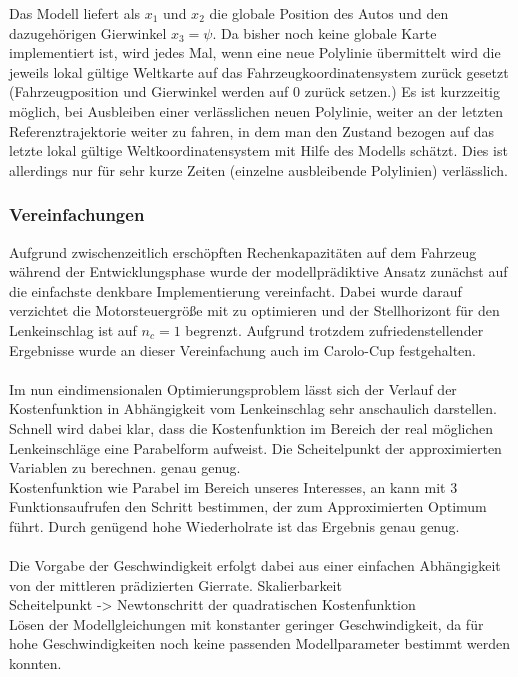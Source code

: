 Das Modell liefert als $x_1$ und $x_2$ die globale Position des Autos und den dazugehörigen Gierwinkel $x_3=\psi$. Da bisher noch keine globale Karte implementiert ist, wird jedes Mal, wenn eine neue Polylinie übermittelt wird die jeweils lokal gültige Weltkarte auf das Fahrzeugkoordinatensystem zurück gesetzt (Fahrzeugposition und Gierwinkel werden auf 0 zurück setzen.) Es ist kurzzeitig möglich, bei Ausbleiben einer verlässlichen neuen Polylinie, weiter an der letzten Referenztrajektorie weiter zu fahren, in dem man den Zustand bezogen auf das letzte lokal gültige Weltkoordinatensystem mit Hilfe des Modells schätzt. Dies ist allerdings nur für sehr kurze Zeiten (einzelne ausbleibende Polylinien) verlässlich.
\subsubsection{Vereinfachungen}
Aufgrund zwischenzeitlich erschöpften Rechenkapazitäten auf dem Fahrzeug während der Entwicklungsphase wurde der modellprädiktive Ansatz zunächst auf die einfachste denkbare Implementierung vereinfacht. Dabei wurde darauf verzichtet die Motorsteuergröße mit zu optimieren und der Stellhorizont für den Lenkeinschlag ist auf $n_c=1$ begrenzt. Aufgrund trotzdem zufriedenstellender Ergebnisse wurde an dieser Vereinfachung auch im Carolo-Cup festgehalten.\\ \\
Im nun eindimensionalen Optimierungsproblem lässt sich der Verlauf der Kostenfunktion in Abhängigkeit vom Lenkeinschlag sehr anschaulich darstellen. Schnell wird dabei klar, dass die Kostenfunktion im Bereich der real möglichen Lenkeinschläge eine Parabelform aufweist. Die Scheitelpunkt der approximierten Variablen zu berechnen. genau genug.\\
Kostenfunktion wie Parabel im Bereich unseres Interesses, an kann mit 3 Funktionsaufrufen den Schritt bestimmen, der zum Approximierten Optimum führt. Durch genügend hohe Wiederholrate ist das Ergebnis genau genug.\\ \\
Die Vorgabe der Geschwindigkeit erfolgt dabei aus einer einfachen Abhängigkeit von der mittleren prädizierten Gierrate. 
Skalierbarkeit\\
Scheitelpunkt -> Newtonschritt der quadratischen Kostenfunktion\\

Lösen der Modellgleichungen mit konstanter geringer Geschwindigkeit, da für hohe Geschwindigkeiten noch keine passenden Modellparameter bestimmt werden konnten.
